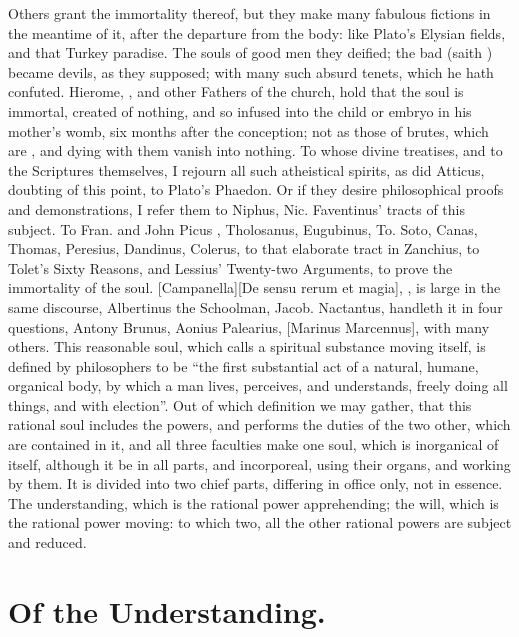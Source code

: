 Others grant the immortality thereof, but they make many fabulous fictions in
the meantime of it, after the departure from the body: like Plato's Elysian
fields, and that Turkey paradise. The souls of good men they deified; the bad
(saith \Austin{}) became devils, as they supposed; with many
such absurd tenets, which he hath confuted. Hierome, \Austin{}, and other Fathers
of the church, hold that the soul is immortal, created of nothing, and so
infused into the child or embryo in his mother's womb, six months after the
conception; not as those of brutes, which are , and dying with them vanish into nothing. To whose divine treatises,
and to the Scriptures themselves, I rejourn all such atheistical spirits, as
\Tully{} did Atticus, doubting of this point, to Plato's Phaedon. Or if they
desire philosophical proofs and demonstrations, I refer them to Niphus, Nic.
Faventinus' tracts of this subject. To Fran. and John Picus
, Tholosanus, Eugubinus, To.
Soto, Canas, Thomas, Peresius, Dandinus, Colerus, to that elaborate tract in
Zanchius, to Tolet's Sixty Reasons, and Lessius' Twenty-two Arguments, to prove
the immortality of the soul. [Campanella][\textlatin{De
sensu rerum et magia}], , is large in
the same discourse, Albertinus the Schoolman, Jacob. Nactantus,
 handleth it in four questions, Antony
Brunus, Aonius Palearius, [Marinus Marcennus], with many
others. This reasonable soul, which \Austin{} calls a spiritual substance moving
itself, is defined by philosophers to be \enquote{the first substantial act of a
natural, humane, organical body, by which a man lives, perceives, and
understands, freely doing all things, and with election}. Out of which
definition we may gather, that this rational soul includes the powers, and
performs the duties of the two other, which are contained in it, and all three
faculties make one soul, which is inorganical of itself, although it be in all
parts, and incorporeal, using their organs, and working by them. It is divided
into two chief parts, differing in office only, not in essence. The
understanding, which is the rational power apprehending; the will, which is the
rational power moving: to which two, all the other rational powers are subject
and reduced.

\section{Of the Understanding.}

